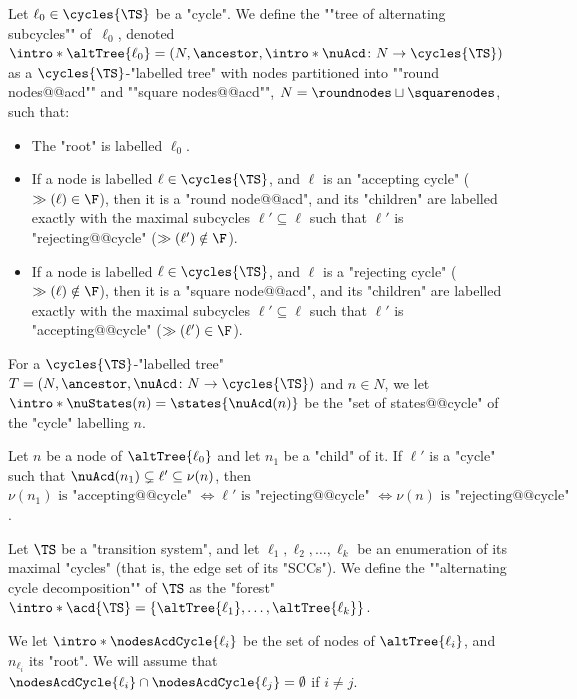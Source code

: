 \documentclass{theoretics}
\begin{document}
\begin{definition}\label{def:tree_alternating_cycles}
	Let $\ell_0 \in \cycles{\TS}$ be a "cycle". 
	\AP We define the ""tree of alternating subcycles"" of~$\ell_0$, denoted $\intro*\altTree{\ell_0} = (N, \ancestor, \intro*\nuAcd\colon N \to \cycles{\TS})$ as a  $\cycles{\TS}$-"labelled tree" with nodes partitioned into ""round nodes@@acd"" and ""square nodes@@acd"", $N= \roundnodes \sqcup \squarenodes$, such that:
	\begin{itemize}
		\item The "root" is labelled $\ell_0$.
		\item If a node is labelled $\ell\in \cycles{\TS}$, and $\ell$ is an "accepting cycle" ($\gg(\ell)\in \F$), then it is a "round node@@acd", and its "children" are labelled exactly with the maximal subcycles $\ell' \subseteq \ell$ such that $\ell'$ is "rejecting@@cycle" ($\gg(\ell') \notin \F$).
		\item If a node is labelled $\ell\in \cycles{\TS}$, and $\ell$ is a "rejecting cycle" ($\gg(\ell)\notin \F$), then it is a "square node@@acd", and its "children" are labelled exactly with the maximal subcycles $\ell' \subseteq \ell$ such that $\ell'$ is "accepting@@cycle" ($\gg(\ell') \in \F$).
	\end{itemize}
\end{definition}


\AP For a $\cycles{\TS}$-"labelled tree" $T = (N, \ancestor, \nuAcd\colon N \to \cycles{\TS})$ and $n\in N$, we let $\intro*\nuStates(n) = \states{\nuAcd(n)}$ be the "set of states@@cycle" of the "cycle" labelling $n$. 

\begin{remark}\label{rmk-acd:union-changes-acceptance}
	Let $n$ be a node of $\altTree{\ell_0}$ and let $n_1$ be a "child" of it. If $\ell'$ is a "cycle" such that $\nuAcd(n_1) \subsetneq \ell' \subseteq \nu(n)$, then $\nu(n_1) \text{ is "accepting@@cycle" } \iff \ell' \text{ is "rejecting@@cycle" } \iff \nu(n) \text{ is "rejecting@@cycle"}$. 
\end{remark}


\begin{definition}\label{def:acd}
	\AP Let $\TS$ be a "transition system", and let $\ell_1, \ell_2, \dots, \ell_k$ be an enumeration of its maximal "cycles" (that is, the edge set of its "SCCs"). We define the ""alternating cycle decomposition"" of $\TS$ as  the "forest" $\intro*\acd{\TS} = \{\altTree{\ell_1},\dots, \altTree{\ell_k}\}$.
	
	We let $\intro*\nodesAcdCycle{\ell_i}$ be the set of nodes of $\altTree{\ell_i}$, and $n_{\ell_i}$ its "root". We will assume that $\nodesAcdCycle{\ell_i} \cap \nodesAcdCycle{\ell_j} = \emptyset$ if $i\neq j$.
\end{definition}
\end{document}
